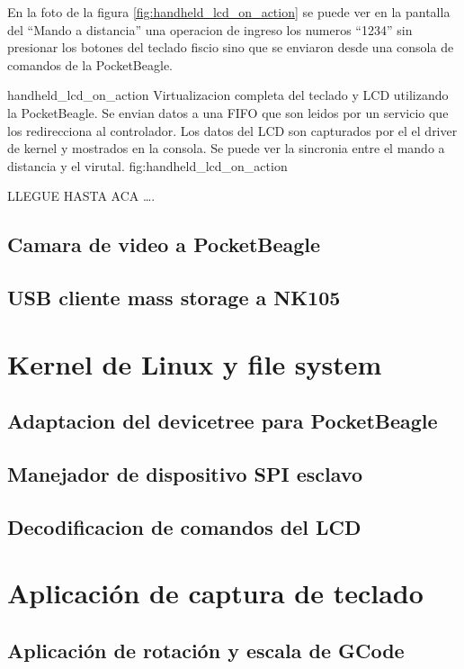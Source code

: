       En la foto de la figura \ref{fig:handheld_lcd_on_action} se puede ver en la pantalla del ``Mando a distancia'' una operacion de ingreso los numeros ``1234'' sin presionar los botones del teclado fiscio sino que se enviaron desde una consola de comandos de la PocketBeagle.\par

         {handheld_lcd_on_action}
         {Virtualizacion completa del teclado y LCD utilizando la PocketBeagle. Se envian datos a una FIFO que son leidos por un servicio que los redirecciona al controlador. Los datos del LCD son capturados por el el driver de kernel y mostrados en la consola. Se puede ver la sincronia entre el mando a distancia y el virutal.}
         {fig:handheld_lcd_on_action}



LLEGUE HASTA ACA \ldots.

   \subsection{Camara de video a PocketBeagle}
   \subsection{USB cliente mass storage a NK105}

\section{Kernel de Linux y file system}
   \subsection{Adaptacion del devicetree para PocketBeagle}
   \subsection{Manejador de dispositivo SPI esclavo}
   \subsection{Decodificacion de comandos del LCD}
\section{Aplicación de captura de teclado}
\subsection{Aplicación de rotación y escala de GCode}
